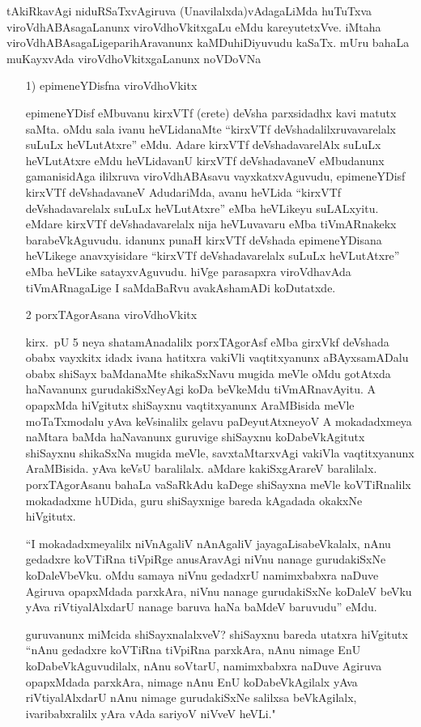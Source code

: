 tAkiRkavAgi niduRSaTxvAgiruva (Unavilalxda)vAdagaLiMda huTuTxva viroVdhA\break BAsagaLanunx viroVdhoVkitxgaLu eMdu kareyutetxVve. iMtaha viroVdhABAsagaLige\break parihAravanunx kaMDuhiDiyuvudu kaSaTx. mUru bahaLa muKayxvAda viroVdhoVkitx\-gaLanunx noVDoVNa
\begin{itemize}
\item[{\rm 1)}] epimeneYDisfna viroVdhoVkitx

epimeneYDisf eMbuvanu kirxVTf {\rm (crete)} deVsha parxsidadhx kavi matutx saMta. oMdu sala ivanu heVLidanaMte ``kirxVTf deVshadalilxruvavarelalx suLuLx heVLutAtxre'' eMdu. Adare kirxVTf deVshadavarelAlx suLuLx heVLutAtxre eMdu heVLidavanU kirxVTf deVshada\-vaneV eMbudanunx gamanisidAga ililxruva viroVdhABAsavu vayxkatxvAguvudu, epimeneYDisf kirxVTf deVshadavaneV AdudariMda, avanu heVLida ``kirxVTf deVshadavarelalx suLuLx heVLutAtxre'' eMba heVLikeyu suLALxyitu. eMdare kirxVTf deVshadavarelalx nija heVLuvavaru eMba tiVmARnakekx barabeVkAguvudu. idanunx punaH kirxVTf deVshada epimeneYDisana heVLikege anavxyisidare ``kirxVTf deVshadavarelalx suLuLx heVLutAtxre'' eMba heVLike satayxvAguvudu. hiVge parasapxra viroVdhavAda tiVmARnagaLige I saMdaBaRvu avakAshamADi koDutatxde.
\item[{\rm 2}] porxTAgorAsana viroVdhoVkitx

kirx.~pU {\rm 5} neya shatamAnadalilx porxTAgorAsf eMba girxVkf deVshada obabx vayxkitx idadx ivana hatitxra vakiVli vaqtitxyanunx aBAyxsamADalu obabx shiSayx baMdanaMte shikaSxNavu mugida meVle oMdu gotAtxda haNavanunx gurudakiSxNeyAgi koDa beVkeMdu tiVmARnavAyitu. A opapxMda hiVgitutx shiSayxnu vaqtitxyanunx AraMBisida meVle moTaTxmodalu yAva keVsinalilx gelavu paDeyutAtxneyoV A mokadadxmeya naMtara baMda haNavanunx guruvige shiSayxnu koDabeVkAgitutx shiSayxnu shikaSxNa mugida meVle, savxtaMtarxvAgi vakiVla vaqtitxyanunx AraMBisida. yAva keVsU baralilalx. aMdare kakiSxgArareV baralilalx. porxTAgorAsanu bahaLa vaSaRkAdu kaDege shiSayxna meVle koVTiRnalilx mokadadxme hUDida, guru shiSayxnige bareda kAgadada okakxNe hiVgitutx.

``I mokadadxmeyalilx niVnAgaliV nAnAgaliV jayagaLisabeVkalalx, nAnu gedadxre koVTiRna tiVpiRge anusAravAgi niVnu nanage gurudakiSxNe koDaleVbeVku. oMdu samaya niVnu gedadxrU namimxbabxra naDuve Agiruva opapxMdada parxkAra, niVnu nanage gurudakiSxNe koDaleV beVku yAva riVtiyalAlxdarU nanage baruva haNa baMdeV baruvudu'' eMdu.

guruvanunx miMcida shiSayxnalalxveV? shiSayxnu bareda utatxra hiVgitutx ``nAnu gedadxre koVTiRna tiVpiRna parxkAra, nAnu nimage EnU koDabeVkAguvudilalx, nAnu soVtarU, namimxbabxra naDuve Agiruva opapxMdada parxkAra, nimage nAnu EnU koDabeVkAgilalx yAva riVtiyalAlxdarU nAnu nimage gurudakiSxNe salilxsa beVkAgilalx, ivaribabxralilx yAra vAda sariyoV niVveV heVLi."


\end{itemize}

